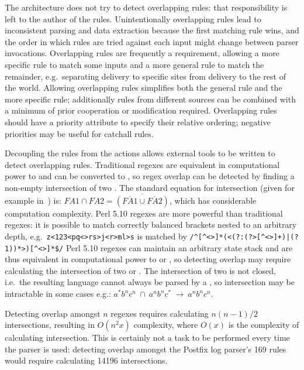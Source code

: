 \documentclass{svmult}
\newcommand{\numberOFrules}[0]{%
    169%
}
\newcommand{\numberOFruleINTERSECTIONS}[0]{%
    14196%
}
\begin{document}
The architecture does not try to detect overlapping rules: that
responsibility is left to the author of the rules.  Unintentionally
overlapping rules lead to inconsistent parsing and data extraction because
the first matching rule wins, and the order in which rules are tried
against each input might change between parser invocations.  Overlapping
rules are frequently a requirement, allowing a more specific rule to match
some inputs and a more general rule to match the remainder, e.g.\
separating \SMTP{} delivery to specific sites from \SMTP{} delivery to the
rest of the world.  Allowing overlapping rules simplifies both the general
rule and the more specific rule; additionally rules from different sources
can be combined with a minimum of prior cooperation or modification
required.  Overlapping rules should have a priority attribute to specify
their relative ordering; negative priorities may be useful for catchall
rules.

Decoupling the rules from the actions allows external tools to be written
to detect overlapping rules.  Traditional regexes are equivalent in
computational power to \FA{} and can be converted to \FA{}, so regex
overlap can be detected by finding a non-empty intersection of two \FA{}\@.
The standard equation for \FA{} intersection (given for example
in~\cite{intersection-of-NFA-using-Z}) is: $FA1 \cap{} FA2 =
\overline{(\overline{FA1} \cup{} \overline{FA2})}$, which has considerable
computation complexity.  Perl 5.10 regexes are more powerful than
traditional regexes: it is possible to match correctly balanced brackets
nested to an arbitrary depth, e.g.\ \verb!z<123<pq<>rs>j<r>ml>s! is matched
by \verb!/^[^<>]*(<(?:(?>[^<>]+)|(?1))*>)[^<>]*$/! Perl 5.10
regexes can maintain an arbitrary state stack and are thus equivalent in
computational power to \PDA{} or \CFL{}, so detecting overlap may require
calculating the intersection of two \PDA{} or \CFL{}\@.  The intersection
of two \CFL{} is not closed, i.e.\ the resulting language cannot always be
parsed by a \CFL{}, so intersection may be intractable in some cases e.g.:
$a^{*}b^{n}c^{n}~\cap~a^{n}b^{n}c^{*}~\rightarrow~a^{n}b^{n}c^{n}$.

Detecting overlap amongst $n$ regexes requires calculating $n(n-1)/2$
intersections, resulting in $O(n^2x)$ complexity, where $O(x)$ is the
complexity of calculating intersection.  This is certainly not a task to be
performed every time the parser is used: detecting overlap amongst the Postfix log
parser's \numberOFrules{} rules would require calculating
\numberOFruleINTERSECTIONS{} intersections.
\end{document}
